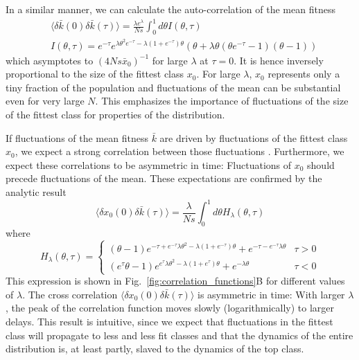 \documentclass[rmp,preprint]{revtex4}
\newcommand{\FIG}[1]{Fig.~\ref{fig:#1}}
\newcommand{\x}{x}
\newcommand{\xs}{\bar{\x}}
\newcommand{\dx}{\delta \x}
\newcommand{\dk}{\delta \bar{k}}
\begin{document}
In a similar manner, we can calculate the auto-correlation of the mean fitness 
\begin{equation}
\begin{split}
&\langle \delta  \bar{k}(0) \delta\bar{k}(\tau)\rangle =\frac{\lambda e^{\lambda}}{N s}\int_0^1 d\theta I(\theta, \tau)\\
&I(\theta, \tau) = e^{-\tau} e^{\lambda \theta^2e^{-\tau} -\lambda(1+e^{-\tau}) \theta} \left(\theta  +\lambda \theta\left(\theta e^{-\tau}- 1\right)\left(\theta- 1\right)\right)
 \end{split}
\end{equation}
which asymptotes to $(4Ns \xs_0)^{-1}$ for large $\lambda$ at $\tau=0$. It is hence inversely proportional to the size of the fittest class $\x_0$. For large $\lambda$, $\x_0$ represents only a tiny fraction of the population and fluctuations of the mean can be substantial even for very large $N$. This emphasizes the importance of fluctuations of the size of the fittest class for properties of the distribution. 

If fluctuations of the mean fitness $\bar{k}$ are driven by fluctuations of the fittest class $\x_0$, we expect a strong correlation between those fluctuations \citep{Etheridge:2007p44291}. Furthermore, we expect these correlations to be asymmetric in time: Fluctuations of $\x_0$ should precede fluctuations of the mean. These expectations are confirmed by the analytic result 
\begin{equation} 
\langle \dx_0(0) \dk(\tau)\rangle = \frac{\lambda}{Ns} \int_0^1 d\theta H_\lambda(\theta,\tau)
\end{equation} 
where
\begin{equation}
H_\lambda(\theta,\tau) = 
\begin{cases} 
(\theta-1)e^{-\tau+e^{-\tau}\lambda \theta^2-\lambda(1+e^{-\tau}) \theta}+ e^{-\tau-e^{-\tau}\lambda \theta} & \tau >0 \\
(e^{\tau} \theta-1)e^{e^{\tau}\lambda \theta^2-\lambda(1+e^{\tau}) \theta}+e^{-\lambda \theta} & \tau <0 
\end{cases}
\end{equation}
This expression is shown in \FIG{correlation_functions}B for different values of $\lambda$. The cross correlation $\langle \dx_0(0) \dk(\tau)\rangle$  is asymmetric in time: With larger $\lambda$, the peak of the correlation function moves slowly (logarithmically) to larger delays. This result is intuitive, since we expect that fluctuations in the fittest class will propagate to less and less fit classes and that the dynamics of the entire distribution is, at least partly, slaved to the dynamics of the top class.
\end{document}
